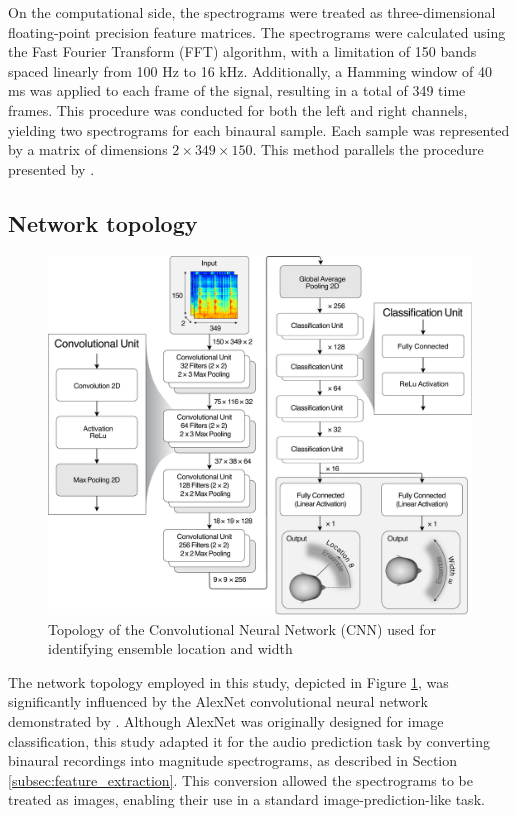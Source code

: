 \documentclass{article}
\begin{document}
On the computational side, the spectrograms were treated as three-dimensional floating-point precision feature matrices. The spectrograms were calculated using the Fast Fourier Transform (FFT) algorithm, with a limitation of 150 bands spaced linearly from 100 Hz to 16 kHz. Additionally, a Hamming window of 40 ms was applied to each frame of the signal, resulting in a total of 349 time frames. This procedure was conducted for both the left and right channels, yielding two spectrograms for each binaural sample. Each sample was represented by a matrix of dimensions $2 \times 349 \times 150$. This method parallels the procedure presented by \cite{zielinski_automatic_2022}.

\subsection{Network topology}
\label{subsec:topology}

\begin{figure}[ht]
  \centering
  \includegraphics[width=\linewidth]{../pictures/architecture.pdf}
  \caption{\label{fig:architecture}Topology of the Convolutional Neural Network (CNN) used for identifying ensemble location and width}
\end{figure}

The network topology employed in this study, depicted in Figure \ref{fig:architecture}, was significantly influenced by the AlexNet convolutional neural network demonstrated by \cite{krizhevsky_imagenet_2012}. Although AlexNet was originally designed for image classification, this study adapted it for the audio prediction task by converting binaural recordings into magnitude spectrograms, as described in Section \ref{subsec:feature_extraction}. This conversion allowed the spectrograms to be treated as images, enabling their use in a standard image-prediction-like task.
\end{document}
